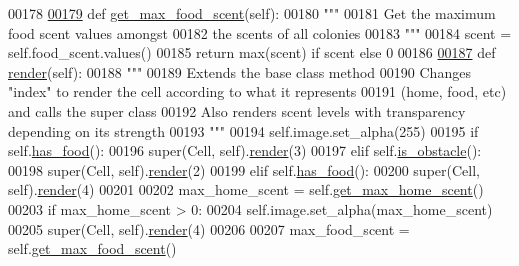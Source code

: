 \begin{DoxyCode}
00178 
\hypertarget{world_8py_source_l00179}{}\hyperlink{classworld_1_1Cell_a7562d15f3a8d223f445a67b89ad60f07}{00179}     \textcolor{keyword}{def }\hyperlink{classworld_1_1Cell_a7562d15f3a8d223f445a67b89ad60f07}{get\_max\_food\_scent}(self):
00180         \textcolor{stringliteral}{"""}
00181 \textcolor{stringliteral}{        Get the maximum food scent values amongst}
00182 \textcolor{stringliteral}{        the scents of all colonies}
00183 \textcolor{stringliteral}{        """}
00184         scent = self.food\_scent.values()
00185         \textcolor{keywordflow}{return} max(scent) \textcolor{keywordflow}{if} scent \textcolor{keywordflow}{else} 0
00186 
\hypertarget{world_8py_source_l00187}{}\hyperlink{classworld_1_1Cell_a11f263897c7a04ae900af84d30a30c56}{00187}     \textcolor{keyword}{def }\hyperlink{classworld_1_1Cell_a11f263897c7a04ae900af84d30a30c56}{render}(self):
00188         \textcolor{stringliteral}{"""}
00189 \textcolor{stringliteral}{        Extends the base class method}
00190 \textcolor{stringliteral}{        Changes "index" to render the cell according to what it represents }
00191 \textcolor{stringliteral}{        (home, food, etc) and calls the super class}
00192 \textcolor{stringliteral}{        Also renders scent levels with transparency depending on its strength}
00193 \textcolor{stringliteral}{        """}
00194         self.image.set\_alpha(255)
00195         \textcolor{keywordflow}{if} self.\hyperlink{classworld_1_1Cell_a1097df1a6fe0131898377358017fe7bc}{has\_food}():
00196             super(Cell, self).\hyperlink{classworld_1_1Cell_a11f263897c7a04ae900af84d30a30c56}{render}(3)
00197         \textcolor{keywordflow}{elif} self.\hyperlink{classworld_1_1Cell_a890e2dc899a32ef86c131a98879e9023}{is\_obstacle}():
00198             super(Cell, self).\hyperlink{classworld_1_1Cell_a11f263897c7a04ae900af84d30a30c56}{render}(2)
00199         \textcolor{keywordflow}{elif} self.\hyperlink{classworld_1_1Cell_a1097df1a6fe0131898377358017fe7bc}{has\_food}():
00200             super(Cell, self).\hyperlink{classworld_1_1Cell_a11f263897c7a04ae900af84d30a30c56}{render}(4)
00201 
00202         max\_home\_scent = self.\hyperlink{classworld_1_1Cell_a05eb363f384507bcca4ab3f9680ba8a9}{get\_max\_home\_scent}()
00203         \textcolor{keywordflow}{if} max\_home\_scent > 0:
00204             self.image.set\_alpha(max\_home\_scent)
00205             super(Cell, self).\hyperlink{classworld_1_1Cell_a11f263897c7a04ae900af84d30a30c56}{render}(4)
00206         
00207         max\_food\_scent = self.\hyperlink{classworld_1_1Cell_a7562d15f3a8d223f445a67b89ad60f07}{get\_max\_food\_scent}()

\end{DoxyCode}
